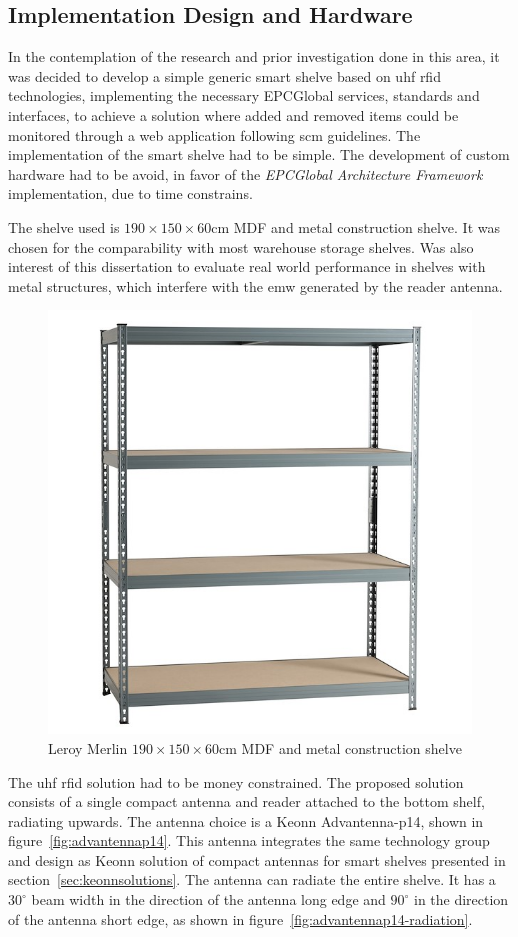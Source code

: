 \subsection{Implementation Design and Hardware}

In the contemplation of the research and prior investigation done in this area, it was decided to develop a simple generic smart shelve based on \ac{uhf} \ac{rfid} technologies, implementing the necessary EPCGlobal services, standards and interfaces, to achieve a solution where added and removed items could be monitored through a web application following \ac{scm} guidelines.
The implementation of the smart shelve had to be simple. The development of custom hardware had to be avoid, in favor of the \emph{EPCGlobal Architecture Framework} implementation, due to time constrains.

The shelve used is $190\times150\times60$cm MDF and metal construction shelve. It was chosen for the comparability with most warehouse storage shelves. Was also interest of this dissertation to evaluate real world performance in shelves with metal structures, which interfere with the \ac{emw} generated by the reader antenna.

\begin{figure}
    \centering
    \includegraphics[width=0.6\linewidth]{./figs/estantedemetal.jpg}
    \caption{Leroy Merlin $190\times150\times60$cm MDF and metal construction shelve~\cite{EstanteMetalSpaceo}} 
    \label{fig:commercialshelve}
\end{figure}

The \ac{uhf} \ac{rfid} solution had to be money constrained. The proposed solution consists of a single compact antenna and reader attached to the bottom shelf, radiating upwards.
The antenna choice is a Keonn Advantenna-p14, shown in figure~\ref{fig:advantennap14}. This antenna integrates the same technology group and design as Keonn solution of compact antennas for smart shelves presented in section~\ref{sec:keonnsolutions}.
The antenna can radiate the entire shelve. It has a $30^{\circ}$ beam width in the direction of the antenna long edge and $90^{\circ}$ in the direction of the antenna short edge, as shown in figure~\ref{fig:advantennap14-radiation}.

